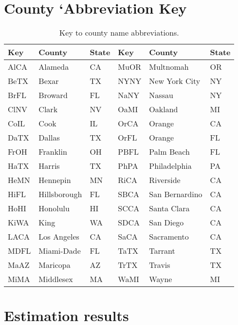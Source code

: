 \documentclass[12pt,letterpaper]{article}
\begin{document}
\appendixpage
\begin{appendices}


\section{County `Abbreviation Key}

\begin{table}[!ht]
\caption{\label{tab:namekey}
Key to county name abbreviations.
}
\centering
\begin{tabular}{lll||lll}
\hline
Key&County&State&Key&County&State\\
\hline
AlCA&Alameda&CA&MuOR&Multnomah&OR\\
BeTX&Bexar&TX&NYNY&New York City&NY\\
BrFL&Broward&FL&NaNY&Nassau&NY\\
ClNV&Clark&NV&OaMI&Oakland&MI\\
CoIL&Cook&IL&OrCA&Orange&CA\\
DaTX&Dallas&TX&OrFL&Orange&FL\\
FrOH&Franklin&OH&PBFL&Palm Beach&FL\\
HaTX&Harris&TX&PhPA&Philadelphia&PA\\
HeMN&Hennepin&MN&RiCA&Riverside&CA\\
HiFL&Hillsborough&FL&SBCA&San Bernardino&CA\\
HoHI&Honolulu&HI&SCCA&Santa Clara&CA\\
KiWA&King&WA&SDCA&San Diego&CA\\
LACA&Los Angeles&CA&SaCA&Sacramento&CA\\
MDFL&Miami-Dade&FL&TaTX&Tarrant&TX\\
MaAZ&Maricopa&AZ&TrTX&Travis&TX\\
MiMA&Middlesex&MA&WaMI&Wayne&MI\\
\hline
\end{tabular}

\end{table}
\clearpage

\section{Estimation results}


\end{appendices}
\end{document}
